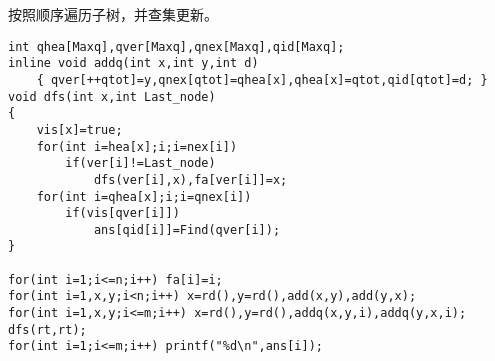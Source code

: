 按照顺序遍历子树，并查集更新。

\begin{verbatim}
int qhea[Maxq],qver[Maxq],qnex[Maxq],qid[Maxq];
inline void addq(int x,int y,int d)
    { qver[++qtot]=y,qnex[qtot]=qhea[x],qhea[x]=qtot,qid[qtot]=d; }
void dfs(int x,int Last_node)
{
    vis[x]=true;
    for(int i=hea[x];i;i=nex[i])
        if(ver[i]!=Last_node)
            dfs(ver[i],x),fa[ver[i]]=x;
    for(int i=qhea[x];i;i=qnex[i])
        if(vis[qver[i]])
            ans[qid[i]]=Find(qver[i]);
}

for(int i=1;i<=n;i++) fa[i]=i;
for(int i=1,x,y;i<n;i++) x=rd(),y=rd(),add(x,y),add(y,x);
for(int i=1,x,y;i<=m;i++) x=rd(),y=rd(),addq(x,y,i),addq(y,x,i);
dfs(rt,rt);
for(int i=1;i<=m;i++) printf("%d\n",ans[i]);
\end{verbatim}